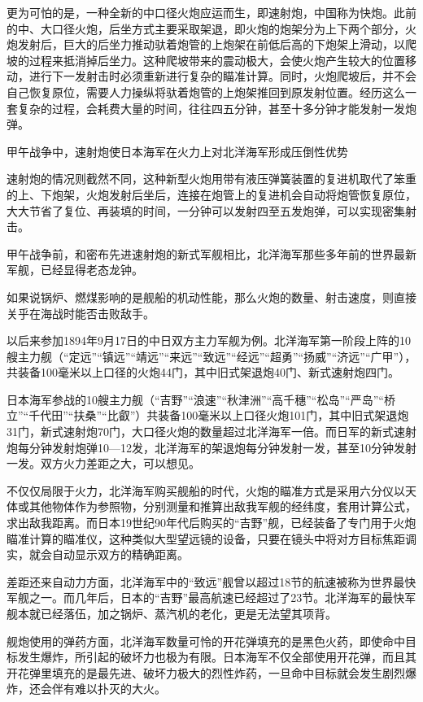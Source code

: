 \documentclass[12pt,UTF8]{ctexbook}
\begin{document}
更为可怕的是，一种全新的中口径火炮应运而生，即速射炮，中国称为快炮。此前的中、大口径火炮，后坐方式主要采取架退，即火炮的炮架分为上下两个部分，火炮发射后，巨大的后坐力推动驮着炮管的上炮架在前低后高的下炮架上滑动，以爬坡的过程来抵消掉后坐力。这种爬坡带来的震动极大，会使火炮产生较大的位置移动，进行下一发射击时必须重新进行复杂的瞄准计算。同时，火炮爬坡后，并不会自己恢复原位，需要人力操纵将驮着炮管的上炮架推回到原发射位置。经历这么一套复杂的过程，会耗费大量的时间，往往四五分钟，甚至十多分钟才能发射一发炮弹。


甲午战争中，速射炮使日本海军在火力上对北洋海军形成压倒性优势

速射炮的情况则截然不同，这种新型火炮用带有液压弹簧装置的复进机取代了笨重的上、下炮架，火炮发射后坐后，连接在炮管上的复进机会自动将炮管恢复原位，大大节省了复位、再装填的时间，一分钟可以发射四至五发炮弹，可以实现密集射击。

甲午战争前，和密布先进速射炮的新式军舰相比，北洋海军那些多年前的世界最新军舰，已经显得老态龙钟。

如果说锅炉、燃煤影响的是舰船的机动性能，那么火炮的数量、射击速度，则直接关乎在海战时能否击败敌手。

以后来参加1894年9月17日的中日双方主力军舰为例。北洋海军第一阶段上阵的10艘主力舰（“定远”“镇远”“靖远”“来远”“致远”“经远”“超勇”“扬威”“济远”“广甲”），共装备100毫米以上口径的火炮44门，其中旧式架退炮40门、新式速射炮四门。

日本海军参战的10艘主力舰（“吉野”“浪速”“秋津洲”“高千穗”“松岛”“严岛”“桥立”“千代田”“扶桑”“比叡”）共装备100毫米以上口径火炮101门，其中旧式架退炮31门，新式速射炮70门，大口径火炮的数量超过北洋海军一倍。而日军的新式速射炮每分钟发射炮弹10—12发，北洋海军的架退炮每分钟发射一发，甚至10分钟发射一发。双方火力差距之大，可以想见。

不仅仅局限于火力，北洋海军购买舰船的时代，火炮的瞄准方式是采用六分仪以天体或其他物体作为参照物，分别测量和推算出敌我军舰的经纬度，套用计算公式，求出敌我距离。而日本19世纪90年代后购买的“吉野”舰，已经装备了专门用于火炮瞄准计算的瞄准仪，这种类似大型望远镜的设备，只要在镜头中将对方目标焦距调实，就会自动显示双方的精确距离。

差距还来自动力方面，北洋海军中的“致远”舰曾以超过18节的航速被称为世界最快军舰之一。而几年后，日本的“吉野”最高航速已经超过了23节。北洋海军的最快军舰本就已经落伍，加之锅炉、蒸汽机的老化，更是无法望其项背。

舰炮使用的弹药方面，北洋海军数量可怜的开花弹填充的是黑色火药，即使命中目标发生爆炸，所引起的破坏力也极为有限。日本海军不仅全部使用开花弹，而且其开花弹里填充的是最先进、破坏力极大的烈性炸药，一旦命中目标就会发生剧烈爆炸，还会伴有难以扑灭的大火。
\end{document}
